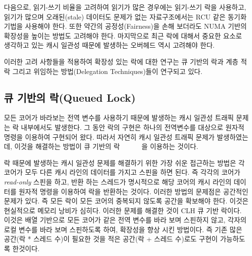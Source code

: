 다음으로, 읽기-쓰기 비율을 고려하여 읽기가 많은 경우에는 읽기-쓰기 락을 사용하고,
읽기가 많으며 오래된(stale) 데이터도 문제가 없는 자료구조에서는 RCU 같은 동기화 기법을 사용해야 한다.  
또한 약간의 공정성(Fairness)을 손해 보더라도 NUMA 기반의 확장성을 높이는 방법도 고려해야 한다.
마지막으로 최근 락에 대해서 중요한 요소로 생각하고 있는 캐시 일관성 때문에 발생하는 
오버헤드 역시 고려해야 한다. 


%


이러한 고려 사항들을 적용하여 확장성 있는 락에 대한 연구는 큐 기반의
락과 계층 적 락 그리고 위임하는 방법(Delegation Techniques)들이 연구되고 있다. 

\subsection{큐 기반의 락(Queued Lock)}
모든 코어가 바라보는 전역 변수를 사용하기 때문에 발생하는 캐시 일관성 트래픽 문제는 
락 내부에서도 발생한다. 
그 동안 락의 구현은 하나의 전역변수를 대상으로 원자적 명령을 이용하여 구현되어 왔다.
따라서 자연히 캐시 일관성 트래픽 문제가 발생하였는데, 이것을 해결하는 방법이 큐 기반의 락
~\cite{MellorCrummey1991MCS}~\cite{Magnusson1994QLC}~\cite{Wang2016BeMyGuest}~\cite{Scott2013SS}
~\cite{Bueso2014MCS}을 이용하는 것이다. 

락 때문에 발생하는 캐시 일관성 문제를 해결하기 위한 가장 쉬운 접근하는 방법은 각 
코어가 모두 다른 캐시 라인의 데이터를 가지고 스핀을 하면 된다.
즉 각각의 코어가 \textit{read-only} 스핀을 하고, 반환 하는 스레드가 명시적으로 해당 코어의 캐시 라인의 데이터를 
원자적 명령을 이용하여 락을 반환하는 것이다. 
이러한 방법의 문제점은 공간적인 문제가 있다. 
즉 모든 락이 모든 코어의 중복되지 않도록 공간을 확보해야 한다.
이것은 현실적으로 메모리 낭비가 심히다.
이러한 문제를 해결한 것이 CLH 큐 기반 락이다. 
이것은 배열 기반으로 모든 코어가 같은 전역 변수를 바라 보며 스핀하지 않고, 
각자의 로컬 변수를 바라 보며 스핀하도록 하여, 확장성을 향상 시킨 방법이다. 
즉 기존 많은 공간(락 * 스레드 수)이 필요한 것을 적은 공간(락 + 스레드 수)로도 구현이 가능하도록 한것이다.


